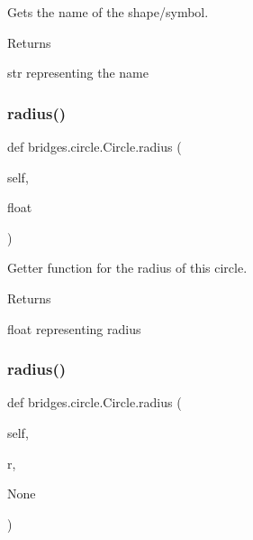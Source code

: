 Gets the name of the shape/symbol. 

\begin{DoxyReturn}{Returns}


str representing the name 
\end{DoxyReturn}
\mbox{\label{classbridges_1_1circle_1_1_circle_abc82c7f3e8ac6112167b396839863319}} 
\subsubsection{\texorpdfstring{radius()}{radius()}\hspace{0.1cm}{\footnotesize\ttfamily [1/2]}}
{\footnotesize\ttfamily def bridges.\+circle.\+Circle.\+radius (\begin{DoxyParamCaption}\item[{}]{self,  }\item[{}]{float }\end{DoxyParamCaption})}



Getter function for the radius of this circle. 

\begin{DoxyReturn}{Returns}


float representing radius 
\end{DoxyReturn}
\mbox{\label{classbridges_1_1circle_1_1_circle_ae7c2dc54c90d954626f99d7561009587}} 
\subsubsection{\texorpdfstring{radius()}{radius()}\hspace{0.1cm}{\footnotesize\ttfamily [2/2]}}
{\footnotesize\ttfamily def bridges.\+circle.\+Circle.\+radius (\begin{DoxyParamCaption}\item[{}]{self,  }\item[{}]{r,  }\item[{}]{None }\end{DoxyParamCaption})}



